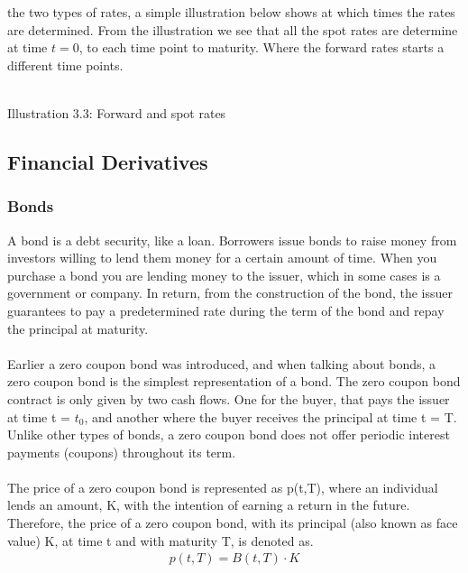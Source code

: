 the two types of rates, a simple illustration below shows at which times the rates are determined. From the illustration
we see that all the spot rates are determine at time $t=0$, to each time point to maturity. Where the forward rates starts
a different time points. 
\\
\begin{center}
    \\[10pt] 
    Illustration 3.3: Forward and spot rates
\end{center}
\newpage
\subsection{Financial Derivatives}
\subsubsection{Bonds}
A bond is a debt security, like a loan. Borrowers issue bonds to raise money 
from investors willing to lend them money for a certain amount of time.
When you purchase a bond you are lending money to the issuer, which in 
some cases is a government or company. In return, from the construction of the 
bond, the issuer guarantees to pay a predetermined rate during the term of the bond
and repay the principal at maturity. 
\\\\
Earlier a zero coupon bond was introduced, and when talking about bonds, a zero coupon 
bond is the simplest representation of a bond. The zero coupon bond contract is 
only given by two cash flows. One for the buyer, that pays the issuer at time 
t = $t_0$, and another where the buyer receives the principal at time t = T.
Unlike other types of bonds, a zero coupon bond does not offer periodic 
interest payments (coupons) throughout its term. \cite{Bjork} 
\\\\
The price of a zero coupon bond is represented as 
p(t,T), where an individual lends an amount, K, with the intention of earning a
return in the future. Therefore, the price of a zero coupon bond, with 
its principal (also known as face value) K, at time t and with maturity 
T, is denoted as.
\begin{align*}
    p(t,T)= B(t,T)\cdot K
\end{align*}
